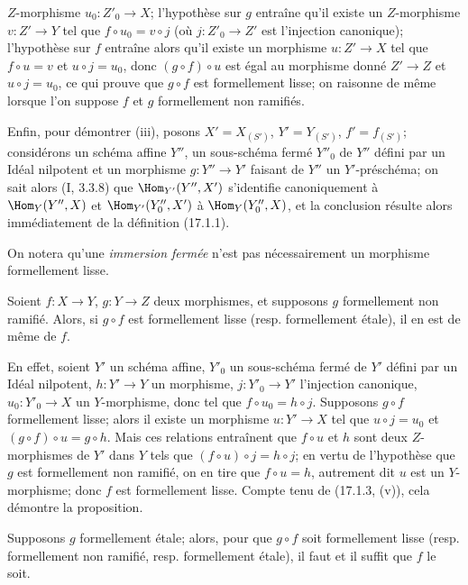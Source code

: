 $Z$-morphisme $u_0:Z'_0\to X$; l'hypothèse sur $g$ entraîne qu'il existe un $Z$-morphisme $v:Z'\to Y$ tel que $f\circ u_0=v\circ j$ (où $j:Z'_0\to Z'$ est l'injection canonique); l'hypothèse sur $f$ entraîne alors qu'il existe un morphisme $u:Z'\to X$ tel que $f\circ u=v$ et $u\circ j=u_0$, donc $(g\circ f)\circ u$ est égal au morphisme donné $Z'\to Z$ et $u\circ j=u_0$, ce qui prouve que $g\circ f$ est formellement lisse; on raisonne de même lorsque l'on suppose $f$ et $g$ formellement non ramifiés.

Enfin, pour démontrer (iii), posons $X'=X_{(S')}$, $Y'=Y_{(S')}$, $f'=f_{(S')}$; considérons un schéma affine $Y''$, un sous-schéma fermé $Y''_0$ de $Y''$ défini par un Idéal nilpotent et un morphisme $g:Y''\to Y'$ faisant de $Y''$ un $Y'$-préschéma; on sait alors (I, 3.3.8) que $\Hom_{Y'}(Y'',X')$ s'identifie canoniquement à $\Hom_Y(Y'',X)$ et $\Hom_{Y'}(Y''_0,X')$ à $\Hom_Y(Y''_0,X)$, et la conclusion résulte alors immédiatement de la définition (17.1.1).

On notera qu'une \emph{immersion fermée} n'est pas nécessairement un morphisme formellement lisse.

\begin{proposition}[17.1.4]
\label{IV.17.1.4}
Soient $f:X\to Y$, $g:Y\to Z$ deux morphismes, et supposons $g$ formellement non ramifié. Alors, si $g\circ f$ est formellement lisse (resp. formellement étale), il en est de même de $f$.
\end{proposition}

En effet, soient $Y'$ un schéma affine, $Y'_0$ un sous-schéma fermé de $Y'$ défini par un Idéal nilpotent, $h:Y'\to Y$ un morphisme, $j:Y'_0\to Y'$ l'injection canonique, $u_0:Y'_0\to X$ un $Y$-morphisme, donc tel que $f\circ u_0=h\circ j$. Supposons $g\circ f$ formellement lisse; alors il existe un morphisme $u:Y'\to X$ tel que $u\circ j=u_0$ et $(g\circ f)\circ u=g\circ h$. Mais ces relations entraînent que $f\circ u$ et $h$ sont deux $Z$-morphismes de $Y'$ dans $Y$ tels que $(f\circ u)\circ j=h\circ j$; en vertu de l'hypothèse que $g$ est formellement non ramifié, on en tire que $f\circ u=h$, autrement dit $u$ est un $Y$-morphisme; donc $f$ est formellement lisse. Compte tenu de (17.1.3, (v)), cela démontre la proposition.

\begin{corollary}[17.1.5]
\label{IV.17.1.5}
Supposons $g$ formellement étale; alors, pour que $g\circ f$ soit formellement lisse (resp. formellement non ramifié, resp. formellement étale), il faut et il suffit que $f$ le soit.
\end{corollary}

